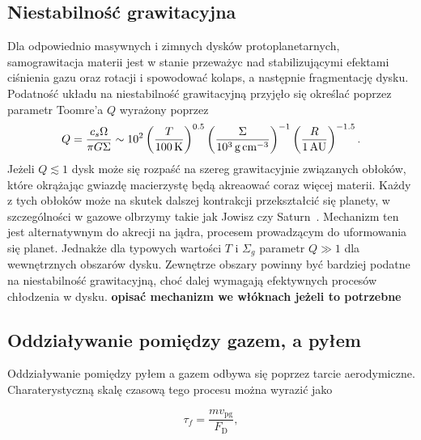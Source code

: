 \subsection{Niestabilność grawitacyjna}
Dla odpowiednio masywnych i zimnych dysków protoplanetarnych, samograwitacja
materii jest w stanie przeważyc nad stabilizującymi efektami ciśnienia gazu oraz
rotacji i spowodować kolaps, a następnie fragmentację dysku. Podatność układu na
niestabilność grawitacyjną przyjęło się określać poprzez parametr Toomre'a $Q$
wyrażony poprzez
\begin{equation}
   Q = \frac{c_s\Omega}{\pi G \Sigma} \sim 10^2 
   \left(\frac{T}{100\hbox{$\thinspace\textrm{K}$}}\right)^{0.5}
   \left(\frac{\Sigma}{10^3\hbox{$\thinspace\textrm{g}$}\hbox{$\thinspace\textrm{cm}$}^{-3}}\right)^{-1}
   \left(\frac{R}{1\hbox{$\thinspace\textrm{AU}$}}\right)^{-1.5}.
\end{equation}
Jeżeli $Q\lesssim1$ dysk może się rozpaść na szereg grawitacyjnie związanych
obłoków, które okrążając gwiazdę macierzystę będą akreaować coraz więcej
materii. Każdy z tych obłoków może na skutek dalszej kontrakcji przekształcić
się planety, w szczególności w gazowe olbrzymy takie jak Jowisz czy
Saturn~\cite{Boss2000}. Mechanizm ten jest alternatywnym do akrecji na jądra,
procesem prowadzącym do uformowania się planet. Jednakże dla typowych wartości
$T$ i $\Sigma_g$ parametr $Q\gg 1$ dla wewnętrznych obszarów dysku. Zewnętrze
obszary powinny być bardziej podatne na niestabilność grawitacyjną, choć dalej
wymagają efektywnych procesów chłodzenia w dysku. 
{\bf opisać mechanizm we włóknach jeżeli to potrzebne}

\subsection{Oddziaływanie pomiędzy gazem, a pyłem}
Oddziaływanie pomiędzy pyłem a gazem odbywa się poprzez tarcie aerodymiczne.
Charaterystyczną skalę czasową tego procesu można wyrazić jako

\begin{equation}
   \tau_f = \frac{mv_\textrm{pg}}{F_\textrm{D}},
\end{equation}

